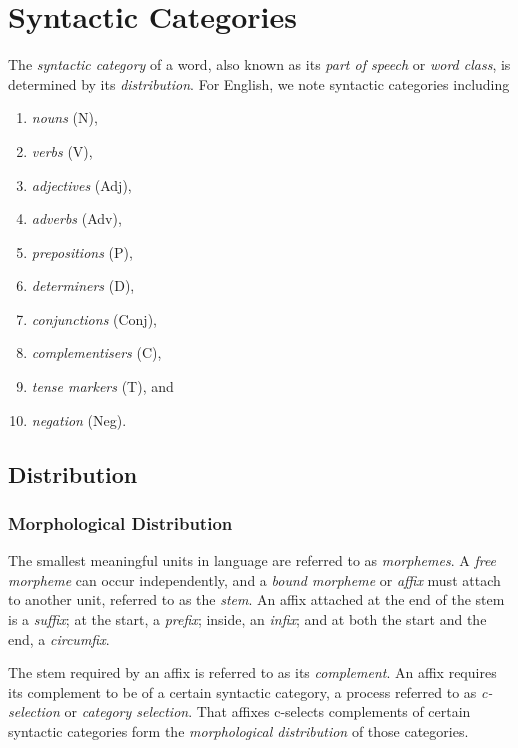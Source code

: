 



\section{Syntactic Categories}

The \emph{syntactic category} of a word, also known as its \emph{part of speech} or \emph{word class}, is determined by
its \emph{distribution}. For English, we note syntactic categories including
\begin{enumerate}
  \item \emph{nouns} (N),
  \item \emph{verbs} (V),
  \item \emph{adjectives} (Adj),
  \item \emph{adverbs} (Adv),
  \item \emph{prepositions} (P),
  \item \emph{determiners} (D),
  \item \emph{conjunctions} (Conj),
  \item \emph{complementisers} (C),
  \item \emph{tense markers} (T), and
  \item \emph{negation} (Neg).
\end{enumerate}

\subsection{Distribution}

\subsubsection{Morphological Distribution}

The smallest meaningful units in language are referred to as \emph{morphemes}. A \emph{free morpheme} can occur
independently, and a \emph{bound morpheme} or \emph{affix} must attach to another unit, referred to as the \emph{stem}.
An affix attached at the end of the stem is a \emph{suffix}; at the start, a \emph{prefix}; inside, an \emph{infix}; and
at both the start and the end, a \emph{circumfix}.

The stem required by an affix is referred to as its \emph{complement}. An affix requires its complement to be of a
certain syntactic category, a process referred to as \emph{c-selection} or \emph{category selection}. That affixes
c-selects complements of certain syntactic categories form the \emph{morphological distribution} of those categories.

